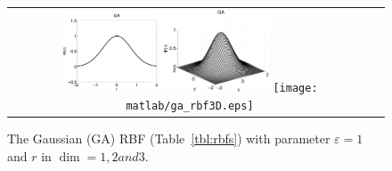 \begin{figure}[t]
\centering
\begin{tabular}{cc}
\includegraphics[width=0.275\textwidth]{matlab/ga_rbf.pdf}
\includegraphics[width=0.3\textwidth]{matlab/ga_rbf2D.eps}
\texttt{[image: matlab/ga\_rbf3D.eps]}
\end{tabular} 
\caption{The Gaussian (GA) RBF (Table~\ref{tbl:rbfs}) with parameter $\varepsilon=1$ and $r$ in $\dim = 1, 2 and 3$.}
\label{fig:rbf_dimension_example}
\end{figure} 